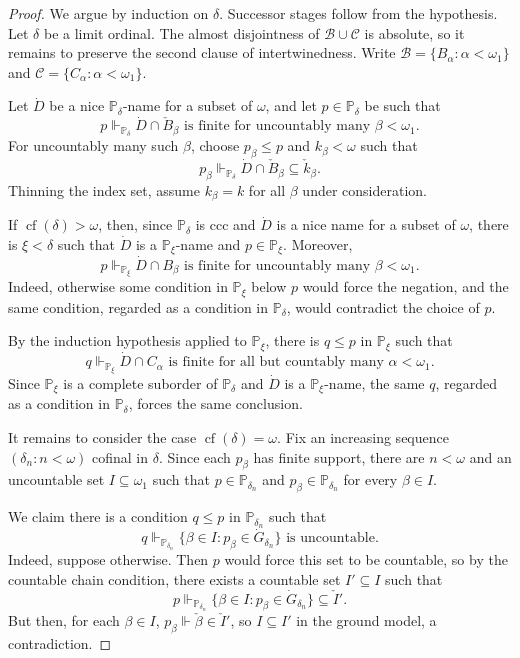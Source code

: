 \begin{proof}
We argue by induction on $\delta$.  Successor stages follow from the
hypothesis.  Let $\delta$ be a limit ordinal.  The almost disjointness of
$\mathcal B\cup\mathcal C$ is absolute, so it remains to preserve the second
clause of intertwinedness.
Write $\mathcal B=\{B_\alpha:\alpha<\omega_1\}$ and $\mathcal C=\{C_\alpha:\alpha<\omega_1\}$.

Let $\dot D$ be a nice $\mathbb P_\delta$-name for a subset of $\omega$, and let
$p\in\mathbb P_\delta$ be such that
\[
  p\Vdash_{\mathbb P_\delta}
  \dot D\cap \check B_\beta\text{ is finite for uncountably many }\beta<\omega_1.
\]
For uncountably many such $\beta$, choose
$p_\beta\leq p$ and $k_\beta<\omega$ such that
\[
  p_\beta\Vdash_{\mathbb P_\delta}
  \dot D\cap \check B_\beta\subseteq\check k_\beta.
\]
Thinning the index set, assume $k_\beta=k$ for all $\beta$ under
consideration.

If $\operatorname{cf}(\delta)>\omega$, then, since $\mathbb P_\delta$ is ccc
and $\dot D$ is a nice name for a subset of $\omega$, there is $\xi<\delta$ such
that $\dot D$ is a $\mathbb P_\xi$-name and $p\in\mathbb P_\xi$.
Moreover,
\[
  p\Vdash_{\mathbb P_\xi}
  \dot D\cap B_\beta\text{ is finite for uncountably many }\beta<\omega_1.
\]
Indeed, otherwise some condition in $\mathbb P_\xi$ below $p$ would force the
negation, and the same condition, regarded as a condition in $\mathbb P_\delta$,
would contradict the choice of $p$.

By the induction hypothesis applied to $\mathbb P_\xi$, there is
$q\leq p$ in $\mathbb P_\xi$ such that
\[
  q\Vdash_{\mathbb P_\xi}
  \dot D\cap C_\alpha\text{ is finite for all but countably many }
  \alpha<\omega_1.
\]
Since $\mathbb P_\xi$ is a complete suborder of $\mathbb P_\delta$ and
$\dot D$ is a $\mathbb P_\xi$-name, the same $q$, regarded as a condition in
$\mathbb P_\delta$, forces the same conclusion.

It remains to consider the case $\operatorname{cf}(\delta)=\omega$.  Fix an
increasing sequence $(\delta_n:n<\omega)$ cofinal in $\delta$.  Since each
$p_\beta$ has finite support, there are $n<\omega$ and an uncountable set
$I\subseteq\omega_1$ such that $p\in\mathbb P_{\delta_n}$ and
$p_\beta\in\mathbb P_{\delta_n}$ for every $\beta\in I$.

We claim there is a condition $q\leq p$ in
$\mathbb P_{\delta_n}$ such that
\[
  q\Vdash_{\mathbb P_{\delta_n}}
  \{\beta\in I:p_\beta\in\dot G_{\delta_n}\}\text{ is uncountable}.
\]
Indeed, suppose otherwise.  Then $p$ would force this set to be countable, so
by the countable chain condition, there exists a countable set $I'\subseteq I$ such that
\[
  p\Vdash_{\mathbb P_{\delta_n}}
  \{\beta\in I:p_\beta\in\dot G_{\delta_n}\}\subseteq \check I'.
\]
But then, for each $\beta\in I$, $p_\beta \Vdash \check \beta\in\check I'$, so $I\subseteq I'$ in the ground model, a contradiction.


\end{proof}
